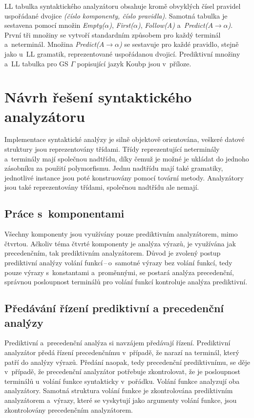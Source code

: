 LL tabulka syntaktického analyzátoru obsahuje kromě obvyklých čísel pravidel uspořádané dvojice \emph{(číslo komponenty, číslo pravidla)}.
Samotná tabulka je sestavena pomocí množin \emph{Empty($\alpha$)}, \emph{First($\alpha$)}, \emph{Follow(A)} a~\emph{Predict($A \rightarrow \alpha$)}.
První tři množiny se vytvoří standardním způsobem pro každý terminál a~neterminál.
Množina \emph{Predict($A \rightarrow \alpha$)} se sestavuje pro každé pravidlo, stejně jako u~LL gramatik, reprezentované uspořádanou dvojicí.
Prediktivní množiny a~LL tabulka pro GS $\Gamma$ popisující jazyk Koubp jsou v~příloze. 


\section{Návrh řešení syntaktického analyzátoru}\label{kap_reseni_sa}
Implementace syntaktické analýzy je silně objektově orientována, veškeré datové struktury jsou reprezentovány třídami.
Třídy reprezentující neterminály a~terminály mají společnou nadtřídu, díky čemuž je možné je ukládat do jednoho zásobníku za použití polymorfismu.
Jednu nadtřídu mají také gramatiky, jednotlivé instance jsou poté konstruovány pomocí tovární metody.
Analyzátory jsou také reprezentovány třídami, společnou nadtřídu ale nemají.

\subsection*{Práce s~komponentami}
Všechny komponenty jsou využívány pouze prediktivním analyzátorem, mimo čtvrtou.
Ačkoliv téma čtvrté komponenty je analýza výrazů, je využívána jak precedenčním, tak prediktivním analyzátorem.
Důvod je zvolený postup prediktivní analýzy volání funkcí\,--\,o~samotné výrazy bez volání funkcí, tedy pouze výrazy s~konstantami a~proměnnými, se postará analýza precedenční, správnou posloupnost terminálů pro volání funkcí kontroluje analýza prediktivní.


\subsection*{Předávání řízení prediktivní a precedenční analýzy}
Prediktivní a~precedenční analýza si navzájem předávají řízení.
Prediktivní analyzátor předá řízení precedenčnímu v~případě, že narazí na terminál, který patří do analýzy výrazů.
Předání naopak, tedy precedenční prediktivnímu, se děje v~případě, že precedenční analyzátor potřebuje zkontrolovat, že je posloupnost terminálů u~volání funkce syntakticky v~pořádku.
Volání funkce analyzují oba analyzátory.
Samotná struktura volání funkce je zkontrolována prediktivním analyzátorem a~výrazy, které se vyskytují jako argumenty volání funkce, jsou zkontrolovány precedenčním analyzátorem.

